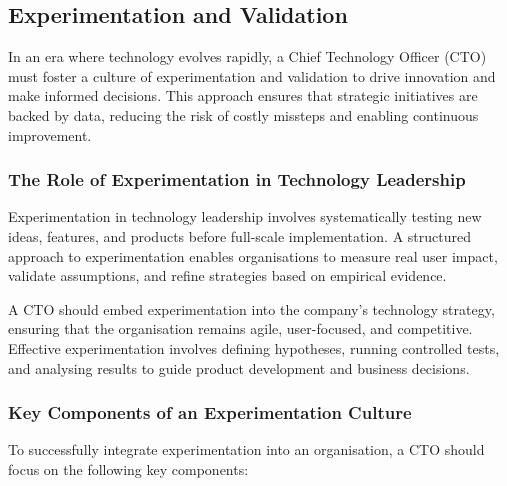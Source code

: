 \subsection{Experimentation and Validation}

In an era where technology evolves rapidly, a Chief Technology Officer (CTO) must foster a culture of experimentation and validation to drive innovation and make informed decisions. This approach ensures that strategic initiatives are backed by data, reducing the risk of costly missteps and enabling continuous improvement.

\subsubsection{The Role of Experimentation in Technology Leadership}
Experimentation in technology leadership involves systematically testing new ideas, features, and products before full-scale implementation. A structured approach to experimentation enables organisations to measure real user impact, validate assumptions, and refine strategies based on empirical evidence.

A CTO should embed experimentation into the company’s technology strategy, ensuring that the organisation remains agile, user-focused, and competitive. Effective experimentation involves defining hypotheses, running controlled tests, and analysing results to guide product development and business decisions.

\subsubsection{Key Components of an Experimentation Culture}
To successfully integrate experimentation into an organisation, a CTO should focus on the following key components:

